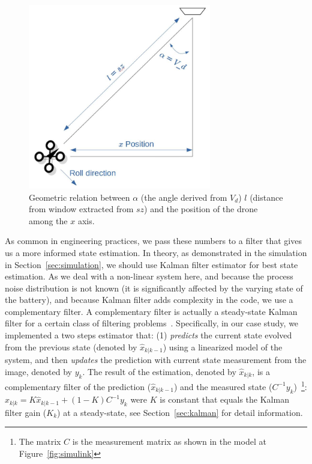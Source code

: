 \documentclass[ twoside, 12pt ]{article}
\begin{document}
\begin{figure} %
    \centerline{\includegraphics[width=80mm]{vd-geometry.jpg}}
    \caption{Geometric relation between $\alpha$ (the angle derived from $V_d$) $l$ (distance from window extracted from $sz$) and the position of the drone among the $x$ axis.}
    \label{fig:V_d-geomerty}
\end{figure}

As common in engineering practices, we pass these numbers to a filter that gives us a more informed state estimation. 
In theory, as demonstrated in the simulation in Section~\ref{sec:simulation}, we should use Kalman filter estimator for best state estimation. As we deal with a non-linear system here, and because the process noise distribution is not known (it is significantly affected by the varying state of the battery), and because Kalman filter adds complexity in the code, we use a complementary filter.
A complementary filter is actually a steady-state Kalman filter for a certain class of filtering problems~\cite{complementaryVSKalman}.
Specifically, in our case study, we implemented a two steps estimator that: (1) \textit{predicts} the current state evolved from the previous state (denoted by $\hat{x}_{k|k-1}$) using a linearized model of the system, and then \textit{updates} the prediction with current state measurement from the image, denoted by $y_k$.
The result of the estimation, denoted by $\hat{x}_{k|k}$, is a complementary filter of the prediction ($\hat{x}_{k|k-1}$) and the measured state ($C^{-1}y_k$)~\footnote{The matrix $C$ is the measurement matrix as shown in the model at Figure~\ref{fig:simulink}}:
$ \hat{x}_{k|k} = K \hat{x}_{k|k-1} + (1-K) C^{-1}y_k $ were $K$ is constant that equals the Kalman filter gain ($K_k$) at a steady-state, see Section~\ref{sec:kalman} for detail information.
\end{document}
